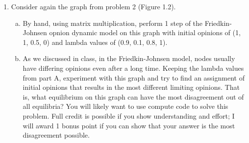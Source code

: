 \documentclass[11pt]{article}
\begin{document}
\begin{enumerate}
	\item Consider again the graph from problem 2 (Figure 1.2).
	\begin{enumerate}[(a)]
		\item By hand, using matrix multiplication, perform 1 step of the Friedkin-Johnsen opnion dynamic model on this graph with initial opinions of (1, 1, 0.5, 0) and lambda values of (0.9, 0.1, 0.8, 1).

		\item As we discussed in class, in the Friedkin-Johnsen model, nodes usually have differing opinions even after a long time. Keeping the lambda values from part A, experiment with this graph and try to find an assignment of initial opinions that results in the most different limiting opinions. That is, what equilibrium on this graph can have the most disagreement out of all equilibria? You will likely want to use compute code to solve this problem. Full credit is possible if you show understanding and effort; I will award 1 bonus point if you can show that your answer is the most disagreement possible.
	\end{enumerate}
\end{enumerate}
\end{document}
